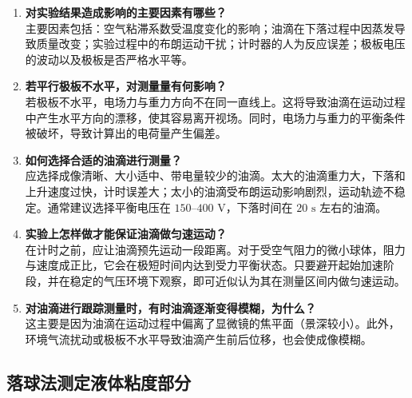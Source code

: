\documentclass[11pt]{article}
\begin{document}
\begin{enumerate}
    \item \textbf{对实验结果造成影响的主要因素有哪些？} \\
    主要因素包括：空气粘滞系数受温度变化的影响；油滴在下落过程中因蒸发导致质量改变；实验过程中的布朗运动干扰；计时器的人为反应误差；极板电压的波动以及极板是否严格水平等。

    \item \textbf{若平行极板不水平，对测量量有何影响？} \\
    若极板不水平，电场力与重力方向不在同一直线上。这将导致油滴在运动过程中产生水平方向的漂移，使其容易离开视场。同时，电场力与重力的平衡条件被破坏，导致计算出的电荷量产生偏差。

    \item \textbf{如何选择合适的油滴进行测量？} \\
    应选择成像清晰、大小适中、带电量较少的油滴。太大的油滴重力大，下落和上升速度过快，计时误差大；太小的油滴受布朗运动影响剧烈，运动轨迹不稳定。通常建议选择平衡电压在 $150\text{--}400\text{ V}$，下落时间在 $20\text{ s}$ 左右的油滴。

    \item \textbf{实验上怎样做才能保证油滴做匀速运动？} \\
    在计时之前，应让油滴预先运动一段距离。对于受空气阻力的微小球体，阻力与速度成正比，它会在极短时间内达到受力平衡状态。只要避开起始加速阶段，并在稳定的气压环境下观察，即可近似认为其在测量区间内做匀速运动。

    \item \textbf{对油滴进行跟踪测量时，有时油滴逐渐变得模糊，为什么？} \\
    这主要是因为油滴在运动过程中偏离了显微镜的焦平面（景深较小）。此外，环境气流扰动或极板不水平导致油滴产生前后位移，也会使成像模糊。
\end{enumerate}

\subsection{落球法测定液体粘度部分}
\end{document}
